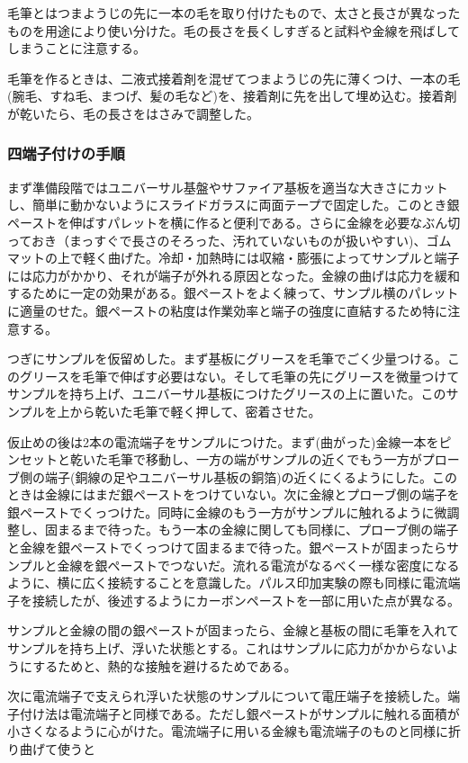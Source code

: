毛筆とはつまようじの先に一本の毛を取り付けたもので、太さと長さが異なったものを用途により使い分けた。毛の長さを長くしすぎると試料や金線を飛ばしてしまうことに注意する。

毛筆を作るときは、二液式接着剤を混ぜてつまようじの先に薄くつけ、一本の毛(腕毛、すね毛、まつげ、髪の毛など)を、接着剤に先を出して埋め込む。接着剤が乾いたら、毛の長さをはさみで調整した。
 
\subsubsection{四端子付けの手順} 
まず準備段階ではユニバーサル基盤やサファイア基板を適当な大きさにカットし、簡単に動かないようにスライドガラスに両面テープで固定した。このとき銀ペーストを伸ばすパレットを横に作ると便利である。さらに金線を必要なぶん切っておき（まっすぐで長さのそろった、汚れていないものが扱いやすい)、ゴムマットの上で軽く曲げた。冷却・加熱時には収縮・膨張によってサンプルと端子には応力がかかり、それが端子が外れる原因となった。金線の曲げは応力を緩和するために一定の効果がある。銀ペーストをよく練って、サンプル横のパレットに適量のせた。銀ペーストの粘度は作業効率と端子の強度に直結するため特に注意する。
 
つぎにサンプルを仮留めした。まず基板にグリースを毛筆でごく少量つける。このグリースを毛筆で伸ばす必要はない。そして毛筆の先にグリースを微量つけてサンプルを持ち上げ、ユニバーサル基板につけたグリースの上に置いた。このサンプルを上から乾いた毛筆で軽く押して、密着させた。
 
仮止めの後は2本の電流端子をサンプルにつけた。まず(曲がった)金線一本をピンセットと乾いた毛筆で移動し、一方の端がサンプルの近くでもう一方がプローブ側の端子(銅線の足やユニバーサル基板の銅箔)の近くにくるようにした。このときは金線にはまだ銀ペーストをつけていない。次に金線とプローブ側の端子を銀ペーストでくっつけた。同時に金線のもう一方がサンプルに触れるように微調整し、固まるまで待った。もう一本の金線に関しても同様に、プローブ側の端子と金線を銀ペーストでくっつけて固まるまで待った。銀ペーストが固まったらサンプルと金線を銀ペーストでつないだ。流れる電流がなるべく一様な密度になるように、横に広く接続することを意識した。パルス印加実験の際も同様に電流端子を接続したが、後述するようにカーボンペーストを一部に用いた点が異なる。
 
サンプルと金線の間の銀ペーストが固まったら、金線と基板の間に毛筆を入れてサンプルを持ち上げ、浮いた状態とする。これはサンプルに応力がかからないようにするためと、熱的な接触を避けるためである。
 
次に電流端子で支えられ浮いた状態のサンプルについて電圧端子を接続した。端子付け法は電流端子と同様である。ただし銀ペーストがサンプルに触れる面積が小さくなるように心がけた。電流端子に用いる金線も電流端子のものと同様に折り曲げて使うと

